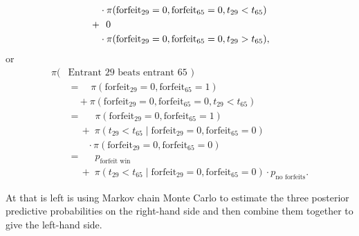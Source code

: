 \documentclass[
  letterpaper,
  DIV=11,
  numbers=noendperiod]{scrartcl}
\begin{document}
\begin{align*}
\\
&\quad\quad \cdot \pi( \mathrm{forfeit}_{29} = 0, \mathrm{forfeit}_{65} = 0,
                       t_{29} < t_{65})
\\
&\quad+ \;\,
\vphantom{\pi( \text{Entrant 29 beats entrant 65 } \mid} 0
\\
&\quad\quad \cdot \pi( \mathrm{forfeit}_{29} = 0, \mathrm{forfeit}_{65} = 0,
                       t_{29} > t_{65}),
\end{align*} or \begin{align*}
\pi( &\text{Entrant 29 beats entrant 65 } )
\\
&=\quad \pi( \mathrm{forfeit}_{29} = 0, \mathrm{forfeit}_{65} = 1 )
\\
&\quad + \pi( \mathrm{forfeit}_{29} = 0, \mathrm{forfeit}_{65} = 0,
              t_{29} < t_{65})
\\
&=\quad \;\,
\pi( \mathrm{forfeit}_{29} = 0, \mathrm{forfeit}_{65} = 1 )
\\
&\quad\ + \; \pi( t_{29} < t_{65} \mid
                  \mathrm{forfeit}_{29} = 0, \mathrm{forfeit}_{65} = 0 )
\\
&\quad\quad \cdot \pi(\mathrm{forfeit}_{29} = 0, \mathrm{forfeit}_{65} = 0)
\\
&=\quad \;\,
p_{\text{forfeit win}}
\\
&\quad\ + \; \pi( t_{29} < t_{65} \mid
                  \mathrm{forfeit}_{29} = 0, \mathrm{forfeit}_{65} = 0 )
\cdot p_{\text{no forfeits}}.
\end{align*}

At that is left is using Markov chain Monte Carlo to estimate the three
posterior predictive probabilities on the right-hand side and then
combine them together to give the left-hand side.
\end{document}
